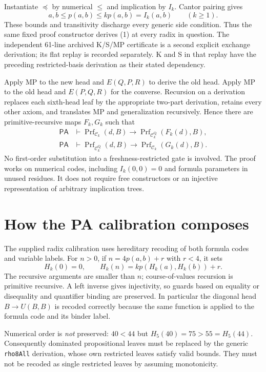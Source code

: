 \documentclass[11pt]{article}
\newcommand{\PA}{\mathsf{PA}}
\newcommand{\C}{\mathcal C}
\begin{document}
Instantiate $\preceq$ by numerical $\le$ and implication by $I_k$.
Cantor pairing gives
\[
 a,b\le p(a,b)\le kp(a,b)=I_k(a,b)\qquad(k\ge1).
\]
These bounds and transitivity discharge every generic side condition.
Thus the same fixed proof constructor derives (1) at every radix in
question. The independent 61-line archived K/S/MP certificate is a second
explicit exchange derivation; its flat replay is recorded separately.
K and S in that replay have the preceding restricted-basis derivation as
their stated dependency.

Apply MP to the new head and $E(Q,P,R)$ to derive the old head. Apply
MP to the old head and $E(P,Q,R)$ for the converse. Recursion on a
derivation replaces each sixth-head leaf by the appropriate two-part
derivation, retains every other axiom, and translates MP and
generalization recursively. Hence there are primitive-recursive maps
$F_k,G_k$ such that
\[
\begin{aligned}
 \PA&\vdash
 \operatorname{Prf}_{\C_k}(d,B)
    \to\operatorname{Prf}_{\C_k^{\mathrm Q}}(F_k(d),B),\\
 \PA&\vdash
 \operatorname{Prf}_{\C_k^{\mathrm Q}}(d,B)
    \to\operatorname{Prf}_{\C_k}(G_k(d),B).
\end{aligned}                                                    \tag{2}
\]
No first-order substitution into a freshness-restricted gate is involved.
The proof works on numerical codes, including $I_k(0,0)=0$ and formula
parameters in unused residues. It does not require free constructors or
an injective representation of arbitrary implication trees.

\section{How the PA calibration composes}
The supplied radix calibration uses hereditary recoding of both formula
codes and variable labels. For $n>0$, if $n=4p(a,b)+r$ with $r<4$, it sets
\[
 H_k(0)=0,\qquad H_k(n)=kp(H_k(a),H_k(b))+r.
\]
The recursive arguments are smaller than $n$; course-of-values recursion
is primitive recursive. A left inverse gives injectivity, so guards based
on equality or disequality and quantifier binding are preserved. In
particular the diagonal head $B\to U(B,B)$ is recoded correctly because
the same function is applied to the formula code and its binder label.

Numerical order is \emph{not} preserved: $40<44$ but
$H_5(40)=75>55=H_5(44)$. Consequently dominated propositional leaves
must be replaced by the generic \texttt{rho8All} derivation, whose own
restricted leaves satisfy valid bounds. They must not be recoded as
single restricted leaves by assuming monotonicity.
\end{document}
